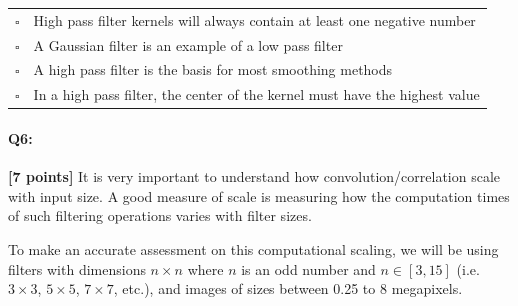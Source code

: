 \begin{enumerate}[(a)]
\begin{tabular}[h]{ll}
$\square$ & High pass filter kernels will always contain at least one negative number \\
$\square$ & A Gaussian filter is an example of a low pass filter \\
$\square$ & A high pass filter is the basis for most smoothing methods \\
$\square$ & In a high pass filter, the center of the kernel must have the highest value \\
\end{tabular}

\end{enumerate}




\pagebreak
\paragraph{Q6:} \textbf{[7 points]}
    It is very important to understand how convolution/correlation scale with input size. A good measure of scale is measuring how the computation times of such filtering operations varies with filter sizes.
    
    To make an accurate assessment on this computational scaling, we will be using filters with dimensions $n \times n$ where $n$ is an odd number and $n \in [3, 15]$ (i.e. $3\times3$, $5\times5$, $7\times7$, etc.), and images of sizes between 0.25 to 8 megapixels.
    
